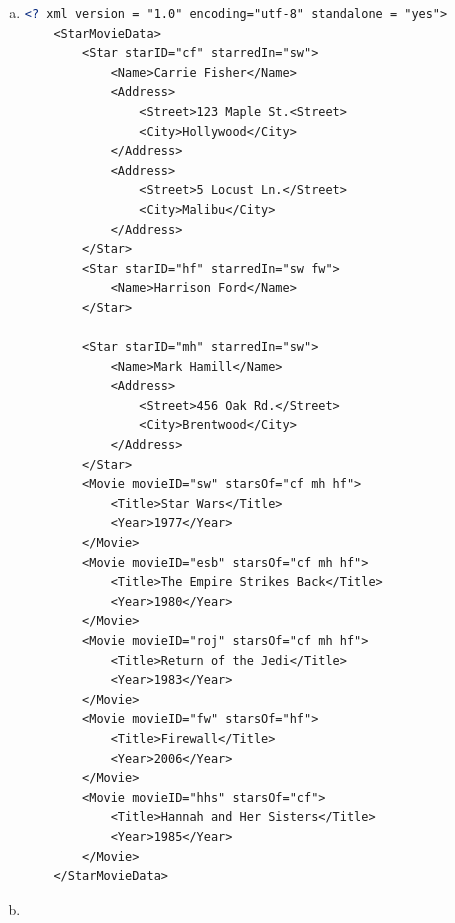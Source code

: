 \documentclass[12pt]{article}
\begin{document}
\begin{enumerate}[1.]
\begin{enumerate}[a)]
        \item

    \begin{lstlisting}[language=XML]
    <? xml version = "1.0" encoding="utf-8" standalone = "yes">
    <StarMovieData>
        <Star starID="cf" starredIn="sw">
            <Name>Carrie Fisher</Name>
            <Address>
                <Street>123 Maple St.<Street>
                <City>Hollywood</City>
            </Address>
            <Address>
                <Street>5 Locust Ln.</Street>
                <City>Malibu</City>
            </Address>
        </Star>
        <Star starID="hf" starredIn="sw fw">
            <Name>Harrison Ford</Name>
        </Star>

        <Star starID="mh" starredIn="sw">
            <Name>Mark Hamill</Name>
            <Address>
                <Street>456 Oak Rd.</Street>
                <City>Brentwood</City>
            </Address>
        </Star>
        <Movie movieID="sw" starsOf="cf mh hf">
            <Title>Star Wars</Title>
            <Year>1977</Year>
        </Movie>
        <Movie movieID="esb" starsOf="cf mh hf">
            <Title>The Empire Strikes Back</Title>
            <Year>1980</Year>
        </Movie>
        <Movie movieID="roj" starsOf="cf mh hf">
            <Title>Return of the Jedi</Title>
            <Year>1983</Year>
        </Movie>
        <Movie movieID="fw" starsOf="hf">
            <Title>Firewall</Title>
            <Year>2006</Year>
        </Movie>
        <Movie movieID="hhs" starsOf="cf">
            <Title>Hannah and Her Sisters</Title>
            <Year>1985</Year>
        </Movie>
    </StarMovieData>
    \end{lstlisting}

        \item


\end{enumerate}
\end{enumerate}
\end{document}
